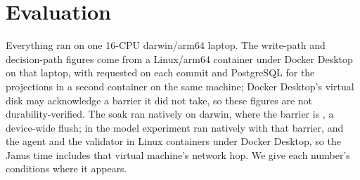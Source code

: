 \section{Evaluation}
\label{sec:eval}

Everything ran on one 16-CPU darwin/arm64 laptop. The write-path and
decision-path figures come from a Linux/arm64 container under Docker Desktop on
that laptop, with  requested on each commit and PostgreSQL for the
projections in a second container on the same machine; Docker Desktop's virtual
disk may acknowledge a barrier it did not take, so these figures are not
durability-verified. The soak ran natively on darwin, where the barrier is
, a device-wide flush; in the model experiment
 ran natively with that barrier, and the agent and the
validator in Linux containers under Docker Desktop, so the Janus time includes
that virtual machine's network hop. We give each number's conditions where it
appears.

